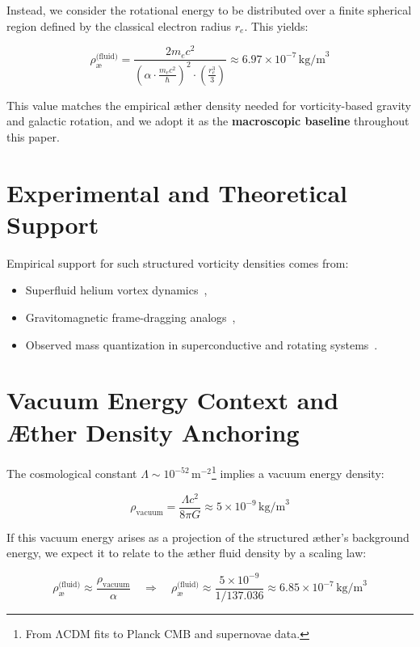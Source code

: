 \documentclass[12pt]{article}
\begin{document}
    Instead, we consider the rotational energy to be distributed over a finite spherical region defined by the classical electron radius \( r_e \). This yields:

    \[
        \rho_{\text{\ae}}^{\text{(fluid)}} = \frac{2 m_e c^2}{\left(\alpha \cdot \frac{m_e c^2}{\hbar}\right)^2 \cdot \left(\frac{r_e^3}{3}\right)} \approx 6.97 \times 10^{-7} \, \text{kg/m}^3
    \]

    This value matches the empirical æther density needed for vorticity-based gravity and galactic rotation, and we adopt it as the \textbf{macroscopic baseline} throughout this paper.

    \section{Experimental and Theoretical Support}

    Empirical support for such structured vorticity densities comes from:

    \begin{itemize}
        \item Superfluid helium vortex dynamics~\cite{jackson2021},
        \item Gravitomagnetic frame-dragging analogs~\cite{paris2015},
        \item Observed mass quantization in superconductive and rotating systems~\cite{santiago2011}.
    \end{itemize}

    \section{Vacuum Energy Context and Æther Density Anchoring}

    The cosmological constant \( \Lambda \sim 10^{-52} \, \text{m}^{-2} \)\footnote{From ΛCDM fits to Planck CMB and supernovae data.} implies a vacuum energy density:

    \[
        \rho_{\text{vacuum}} = \frac{\Lambda c^2}{8\pi G} \approx 5 \times 10^{-9} \, \text{kg/m}^3
    \]

    If this vacuum energy arises as a projection of the structured æther's background energy, we expect it to relate to the æther fluid density by a scaling law:

    \[
        \rho_{\text{\ae}}^{\text{(fluid)}} \approx \frac{\rho_{\text{vacuum}}}{\alpha}
        \quad \Rightarrow \quad
        \rho_{\text{\ae}}^{\text{(fluid)}} \approx \frac{5 \times 10^{-9}}{1/137.036} \approx 6.85 \times 10^{-7} \, \text{kg/m}^3
    \]
\end{document}
